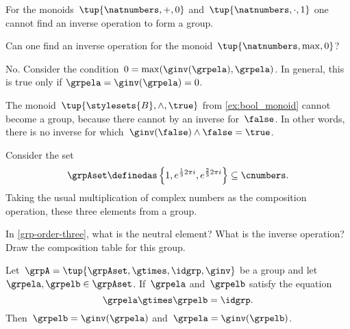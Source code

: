 \begin{example}
    For the monoids~$\tup{\natnumbers, +,0}$ and~$\tup{\natnumbers,\cdot ,1}$ one cannot find an inverse operation to form a group.
\end{example}

\begin{exercise}
    Can one find an inverse operation for the monoid~$\tup{\natnumbers,\max,0}$?
\end{exercise}
%
\begin{solution}
    No.
    Consider the condition~$0=\max(\ginv(\grpela),\grpela)$.
    In general, this is true only if $\grpela=\ginv(\grpela)=0$.
\end{solution}

\begin{example}
    The monoid~$\tup{\stylesets{B},\wedge, \true}$ from \cref{ex:bool_monoid} cannot become a group, because there cannot by an inverse for~$\false$.
    In other words, there is no inverse for which~$\ginv(\false)\wedge \false=\true$.
\end{example}
\begin{example}
    \label{grp-order-three}
    Consider the set
    \begin{equation*}
        \grpAset \definedas \left\{ 1, e^{\frac{1}{3}2\pi i}, e^{\frac{2 }{3}2\pi i}  \right\} \subseteq \cnumbers.
    \end{equation*}
    Taking the usual multiplication of complex numbers as the composition operation, these three elements from a group.
\end{example}

\begin{gradedexercise}
    \label{ex:GroupWithThreeElements}
    In \cref{grp-order-three}, what is the neutral element? What is the inverse operation?
    Draw the composition table for this group.
\end{gradedexercise}


\begin{lemma}
    \label{lem:inv-op-unique}
    Let~$\grpA = \tup{ \grpAset, \gtimes, \idgrp, \ginv }$ be a group and let~$\grpela, \grpelb \in \grpAset$.
    If~$\grpela$ and~$\grpelb$ satisfy the equation
    \begin{equation}
        \grpela \gtimes \grpelb = \idgrp.
    \end{equation}
    Then~$\grpelb = \ginv( \grpela )$ and~$\grpela = \ginv(\grpelb)$.
\end{lemma}

